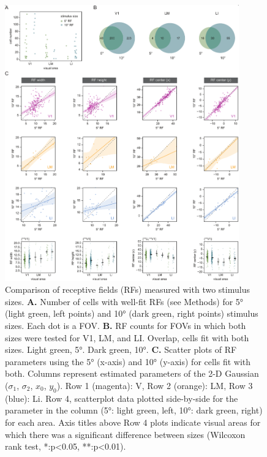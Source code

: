 \begin{figure}[hbt!]
\includegraphics[width=0.9\textwidth]{figures/supplemental/fig_s6_rf5_v_rf10/fig_s6_rf5_rf10.pdf}
    \centering
    \caption[RF mapping stimulus sizes]{Comparison of receptive fields (RFs) measured with two stimulus sizes.
    \textbf{A.} Number of cells with well-fit RFs (see Methods) for \ang{5} (light green, left points) and \ang{10} (dark green, right points) stimulus sizes. Each dot is a FOV.
    \textbf{B.} RF counts for FOVs in which both sizes were tested for V1, LM, and LI. Overlap, cells fit with both sizes. Light green, \ang{5}. Dark green, \ang{10}.
    \textbf{C.} Scatter plots of RF parameters using the \ang{5} (x-axis) and \ang{10} (y-axis) for cells fit with both. Columns represent estimated parameters of the 2-D Gaussian ($\sigma_1$, $\sigma_2$, $x_0$, $y_0$). Row 1 (magenta): V, Row 2 (orange): LM, Row 3 (blue): Li. Row 4, scatterplot data plotted side-by-side for the parameter in the column (\ang{5}: light green, left, \ang{10}: dark green, right) for each area. Axis titles above Row 4 plots indicate visual areas for which there was a significant difference between sizes (Wilcoxon rank test, *:p<0.05, **:p<0.01).
    \label{supfig:rf5_rf10}}
\end{figure}


